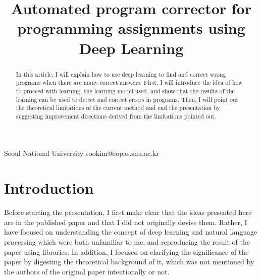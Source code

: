 \documentclass[nocopyrightspace]{sigplanconf}
\begin{document}
\setlength{\pdfpageheight}{\paperheight}
\setlength{\pdfpagewidth}{\paperwidth}






\title{Automated program corrector for programming assignments using Deep Learning}

           {Seoul National University}
           {sookim@ropas.snu.ac.kr}

\maketitle

\begin{abstract}

In this article, I will explain how to use deep learning to find and correct wrong programs when there are many correct answers. First, I will introduce the idea of how to proceed with learning, the learning model used, and show that the results of the learning can be used to detect and correct errors in programs. Then, I will point out the theoretical limitations of the current method and end the presentation by suggesting improvement directions derived from the limitations pointed out.

\end{abstract}

\section{Introduction}

Before starting the presentation, I first make clear that the ideas presented here are in the published paper\cite{pu2016sk_p} and that I did not originally devise them. Rather, I have focused on understanding the concept of deep learning and natural language processing which were both unfamiliar to me, and reproducing the result of the paper using libraries. In addition, I focused on clarifying the significance of the paper by digesting the theoretical background of it, which was not mentioned by the authors of the original paper intentionally or not.
\end{document}
